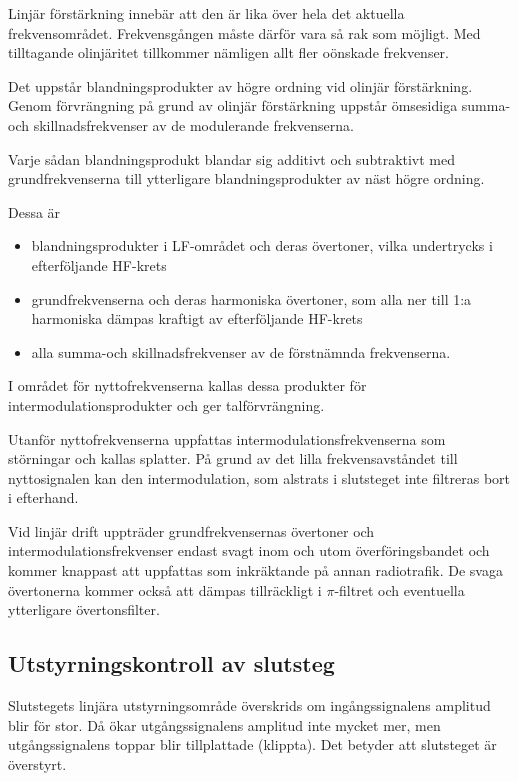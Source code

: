 Linjär förstärkning innebär att den är lika över hela det aktuella
frekvensområdet.
Frekvensgången måste därför vara så rak som möjligt.
Med tilltagande olinjäritet tillkommer nämligen allt fler oönskade frekvenser.

Det uppstår blandningsprodukter av högre ordning vid olinjär förstärkning.
Genom förvrängning på grund av olinjär förstärkning uppstår ömsesidiga summa-
och skillnadsfrekvenser av de modulerande frekvenserna.

Varje sådan blandningsprodukt blandar sig additivt och subtraktivt med
grundfrekvenserna till ytterligare blandningsprodukter av näst högre ordning.

Dessa är
\begin{itemize}
\item blandningsprodukter i LF-området och deras övertoner, vilka
  undertrycks i efterföljande HF-krets

\item grundfrekvenserna och deras harmoniska övertoner, som alla ner
  till 1:a harmoniska dämpas kraftigt av efterföljande HF-krets

\item alla summa-och skillnadsfrekvenser av de förstnämnda frekvenserna.
\end{itemize}

I området för nyttofrekvenserna kallas dessa produkter för
intermodulationsprodukter och ger talförvrängning.

Utanför nyttofrekvenserna uppfattas intermodulationsfrekvenserna som
störningar och kallas splatter.
På grund av det lilla frekvensavståndet till nyttosignalen kan den
intermodulation, som alstrats i slutsteget inte filtreras bort i efterhand.

Vid linjär drift uppträder grundfrekvensernas övertoner och
intermodulationsfrekvenser endast svagt inom och utom
överföringsbandet och kommer knappast att uppfattas som inkräktande på
annan radiotrafik.
De svaga övertonerna kommer också att dämpas tillräckligt i \(\pi \)-filtret
och eventuella ytterligare övertonsfilter.


\subsection{Utstyrningskontroll av slutsteg}

Slutstegets linjära utstyrningsområde överskrids om ingångssignalens
amplitud blir för stor.
Då ökar utgångssignalens amplitud inte mycket mer, men utgångssignalens toppar
blir tillplattade (klippta).
Det betyder att slutsteget är överstyrt.

